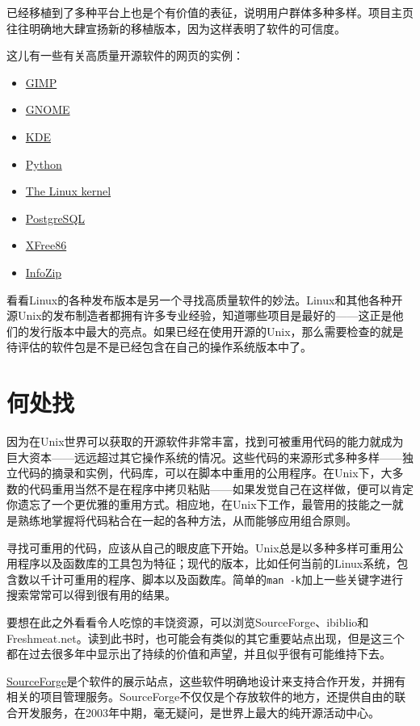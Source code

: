 \documentclass[12pt,oneside]{ctexbook}
\begin{document}
\begin{common-format}
已经移植到了多种平台上也是个有价值的表征，说明用户群体多种多样。项目主页往往明确地大肆宣扬新的移植版本，因为这样表明了软件的可信度。

这儿有一些有关高质量开源软件的网页的实例：
\begin{itemize}
\item \href{http://www.gimp.org/}{GIMP}
\item \href{http://www.gnome.org/}{GNOME}
\item \href{http://www.kde.org/}{KDE}
\item \href{http://www.python.org/}{Python}
\item \href{http://www.kernel.org/}{The Linux kernel}
\item \href{http://www.postgresql.org/}{PostgreSQL}
\item \href{http://xfree86.org/}{XFree86}
\item \href{http://www.info-zip.org/pub/infozip/}{InfoZip}
\end{itemize}

看看Linux的各种发布版本是另一个寻找高质量软件的妙法。Linux和其他各种开源Unix的发布制造者都拥有许多专业经验，知道哪些项目是最好的——这正是他们的发行版本中最大的亮点。如果已经在使用开源的Unix，那么需要检查的就是待评估的软件包是不是已经包含在自己的操作系统版本中了。


\section{何处找}
因为在Unix世界可以获取的开源软件非常丰富，找到可被重用代码的能力就成为巨大资本——远远超过其它操作系统的情况。这些代码的来源形式多种多样——独立代码的摘录和实例，代码库，可以在脚本中重用的公用程序。在Unix下，大多数的代码重用当然不是在程序中拷贝粘贴——如果发觉自己在这样做，便可以肯定你遗忘了一个更优雅的重用方式。相应地，在Unix下工作，最管用的技能之一就是熟练地掌握将代码粘合在一起的各种方法，从而能够应用组合原则。

寻找可重用的代码，应该从自己的眼皮底下开始。Unix总是以多种多样可重用公用程序以及函数库的工具包为特征；现代的版本，比如任何当前的Linux系统，包含数以千计可重用的程序、脚本以及函数库。简单的\verb+man -k+加上一些关键字进行搜索常常可以得到很有用的结果。

要想在此之外看看令人吃惊的丰饶资源，可以浏览SourceForge、ibiblio和Freshmeat.net。读到此书时，也可能会有类似的其它重要站点出现，但是这三个都在过去很多年中显示出了持续的价值和声望，并且似乎很有可能维持下去。

\href{http://www.sourceforge.net/}{SourceForge}是个软件的展示站点，这些软件明确地设计来支持合作开发，并拥有相关的项目管理服务。SourceForge不仅仅是个存放软件的地方，还提供自由的联合开发服务，在2003年中期，毫无疑问，是世界上最大的纯开源活动中心。


\end{common-format}
\end{document}
